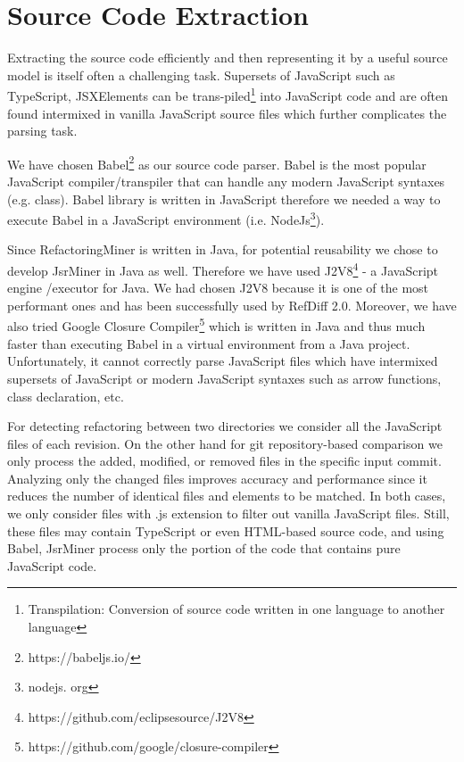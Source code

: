 \documentclass[letterpaper,12pt,onecolumn,final]{report}
\begin{document}


\section {Source Code Extraction}
Extracting the source code efficiently and then representing it by a useful source model is itself often a challenging task. Supersets of JavaScript such as TypeScript, JSXElements can be trans-piled\footnote{Transpilation: Conversion of source code written in one language to another language} into JavaScript code and are often found intermixed in vanilla JavaScript source files which further complicates the parsing task.

We have chosen Babel\footnote{https://babeljs.io/} as our source code parser. Babel is the most popular JavaScript compiler/transpiler that can handle any modern JavaScript syntaxes (e.g. class). Babel library is written in JavaScript therefore we needed a way to execute Babel in a JavaScript environment (i.e. NodeJs\footnote{nodejs. org}).

Since RefactoringMiner is written in Java, for potential reusability we chose to develop JsrMiner in Java as well. Therefore we have used J2V8\footnote{https://github.com/eclipsesource/J2V8} - a JavaScript engine /executor for Java. We had chosen J2V8 because it is one of the most performant ones and has been successfully used by RefDiff 2.0\cite{Silva2020}. Moreover, we have also tried Google Closure Compiler\footnote{https://github.com/google/closure-compiler} which is written in Java and thus much faster than executing Babel in a virtual environment from a Java project. Unfortunately, it cannot correctly parse JavaScript files which have intermixed supersets of JavaScript or modern JavaScript syntaxes such as arrow functions, class declaration, etc.

For detecting refactoring between two directories we consider all the JavaScript files of each revision. On the other hand for git repository-based comparison we only process the added, modified, or removed files in the specific input commit. Analyzing only the changed files improves accuracy and performance since it reduces the number of identical files and elements to be matched. In both cases, we only consider files with .js extension to filter out vanilla JavaScript files. Still, these files may contain TypeScript or even HTML-based source code, and using Babel, JsrMiner process only the portion of the code that contains pure JavaScript code.
\end{document}

